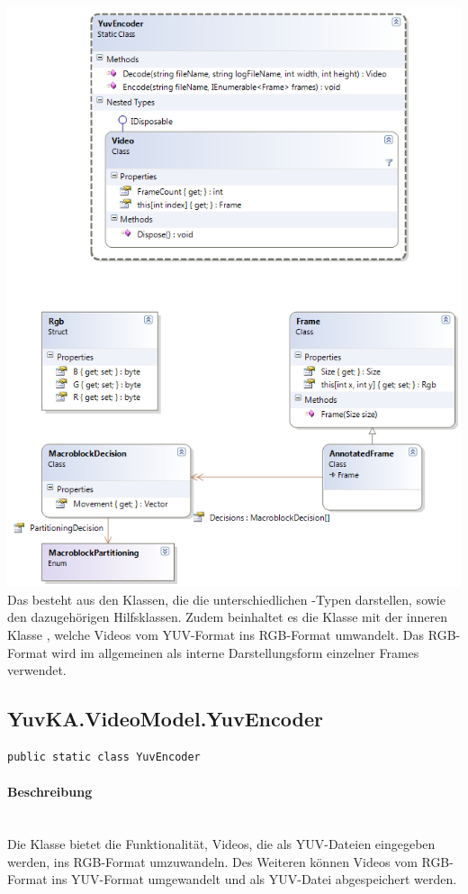 \includegraphics[width=\textwidth]{YuvKA.VideoModel/videomodel.png}
Das  besteht aus den Klassen, die die unterschiedlichen -Typen darstellen, sowie den dazugehörigen Hilfsklassen. Zudem beinhaltet es die Klasse  mit der inneren Klasse , welche Videos vom YUV-Format ins RGB-Format umwandelt. Das RGB-Format wird im allgemeinen als interne Darstellungsform einzelner Frames verwendet.

\subsection{YuvKA.VideoModel.YuvEncoder}

\begin{verbatim}
public static class YuvEncoder
\end{verbatim}

\paragraph{Beschreibung}~\\
Die Klasse  bietet die Funktionalität, Videos, die als YUV-Dateien eingegeben werden, ins RGB-Format umzuwandeln. Des Weiteren können Videos vom RGB-Format ins YUV-Format umgewandelt und als YUV-Datei abgespeichert werden.

